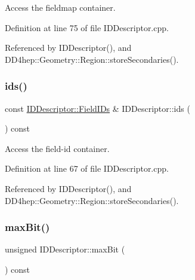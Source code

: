 Access the fieldmap container. 



Definition at line 75 of file I\+D\+Descriptor.\+cpp.



Referenced by I\+D\+Descriptor(), and D\+D4hep\+::\+Geometry\+::\+Region\+::store\+Secondaries().

\hypertarget{class_d_d4hep_1_1_geometry_1_1_i_d_descriptor_a077a567e44dc8200d05e6eae30c42870}{}\label{class_d_d4hep_1_1_geometry_1_1_i_d_descriptor_a077a567e44dc8200d05e6eae30c42870} 
\subsubsection{\texorpdfstring{ids()}{ids()}}
{\footnotesize\ttfamily const \hyperlink{class_d_d4hep_1_1_geometry_1_1_i_d_descriptor_a0ced4a2fe6dd5775becad359f39a9ee2}{I\+D\+Descriptor\+::\+Field\+I\+Ds} \& I\+D\+Descriptor\+::ids (\begin{DoxyParamCaption}{ }\end{DoxyParamCaption}) const}



Access the field-\/id container. 



Definition at line 67 of file I\+D\+Descriptor.\+cpp.



Referenced by I\+D\+Descriptor(), and D\+D4hep\+::\+Geometry\+::\+Region\+::store\+Secondaries().

\hypertarget{class_d_d4hep_1_1_geometry_1_1_i_d_descriptor_a18aca33980ee8741f1d7d3285d8db25f}{}\label{class_d_d4hep_1_1_geometry_1_1_i_d_descriptor_a18aca33980ee8741f1d7d3285d8db25f} 
\subsubsection{\texorpdfstring{max\+Bit()}{maxBit()}}
{\footnotesize\ttfamily unsigned I\+D\+Descriptor\+::max\+Bit (\begin{DoxyParamCaption}{ }\end{DoxyParamCaption}) const}



